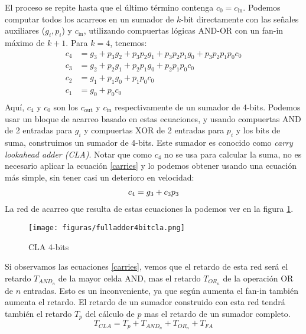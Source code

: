 El proceso se repite hasta que el último término contenga $c_0 = c_{\text{in}}$. Podemos computar todos los acarreos en un sumador de $k$-bit directamente con las señales auxiliares ($g_i,p_i$) y $c_{\text{in}}$, utilizando compuertas lógicas AND-OR con un fan-in máximo de $k+1$. Para $k=4$, tenemos:
\begin{equation}
\begin{align}
c_4 &=g_{3} +p_{3}g_{2}+p_{3}p_{2}g_{1}+p_{3}p_{2}p_{1}g_{0}+p_{3}p_{2}p_{1}p_{0}c_{0}\\
c_3 &=g_{2} +p_{2}g_{1}+p_{2}p_{1}g_{0}+p_2p_1p_0c_0\\
c_2 &=g_{1} +p_{1}g_{0}+p_{1}p_{0}c_{0}\\
c_1 &=g_0+p_0c_0\\
\label{carries}	
\end{align}
\end{equation}	
Aquí, $c_4$ y $c_0$ son los $c_{\text{out}}$ y $c_{\text{in}}$ respectivamente de un sumador de 4-bits. Podemos usar un bloque de acarreo basado en estas ecuaciones, y usando compuertas AND de 2 entradas para $g_i$ y compuertas XOR de 2 entradas para $p_i$ y los bits de suma, construimos un sumador de 4-bits. Este sumador es conocido como \emph{carry lookahead adder (CLA)}. Notar que como $c_4$ no se usa para calcular la suma, no es necesario aplicar la ecuación \ref{carries} y lo podemos obtener usando una ecuación más simple, sin tener casi un deterioro en velocidad:
\begin{equation}
\begin{align}
c_4 = g_3 + c_3p_3 \notag
\end{align}
\end{equation}
La red de acarreo que resulta de estas ecuaciones la podemos ver en la figura \ref{cla4bits}.
\begin{figure}[h]
  \centering
\texttt{[image: figuras/fulladder4bitcla.png]}
\vspace{-1pt}
  \caption{CLA 4-bits}
  \label{cla4bits}
\vspace{-15pt}
\end{figure}

Si observamos las ecuaciones \ref{carries}, vemos que el retardo de esta red será el retardo $T_{AND_n}$ de la mayor celda AND, mas el retardo $T_{OR_n}$ de la operación OR de $n$ entradas. Esto es un inconveniente, ya que según aumenta el fan-in también aumenta el retardo. El retardo de un sumador construido con esta red tendrá también el retardo $T_p$ del cálculo de $p$ mas el retardo de un sumador completo.
\begin{equation}
T_{CLA} = T_p + T_{AND_n} + T_{OR_n} + T_{FA}
\end{equation}

